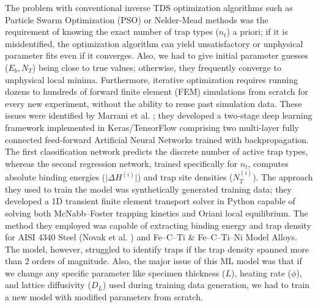 \documentclass[a4paper,12pt,oneside]{report}
\begin{document}
The problem with conventional inverse TDS optimization algorithms such as Particle Swarm Optimization (PSO) or Nelder-Mead methods was the requirement of knowing the exact number of trap types ($n_t$) a priori; if it is misidentified, the optimization algorithm can yield unsatisfactory or unphysical parameter fits even if it converges. Also, we had to give initial parameter guesses ($E_b, N_T$) being close to true values; otherwise, they frequently converge to unphysical local minima. Furthermore, iterative optimization requires running dozens to hundreds of forward finite element (FEM) simulations from scratch for every new experiment, without the ability to reuse past simulation data. These issues were identified by Marrani et al. \cite{Marrani2025}; they developed a two-stage deep learning framework implemented in Keras/TensorFlow comprising two multi-layer fully connected feed-forward Artificial Neural Networks trained with backpropagation. The first classification network predicts the discrete number of active trap types, whereas the second regression network, trained specifically for $n_t$, computes absolute binding energies ($\vert{}\Delta H^{(i)}\vert{}$) and trap site densities ($N_T^{(i)}$). The approach they used to train the model was synthetically generated training data; they developed a 1D transient finite element transport solver in Python capable of solving both McNabb–Foster trapping kinetics and Oriani local equilibrium. The method they employed was capable of extracting binding energy and trap density for AISI 4340 Steel (Novak et al. \cite{Novak2010}) and Fe–C–Ti \& Fe–C–Ti–Ni Model Alloys. The model, however, struggled to identify traps if the trap density spanned more than 2 orders of magnitude. Also, the major issue of this ML model was that if we change any specific parameter like specimen thickness ($L$), heating rate ($\phi$), and lattice diffusivity ($D_L$) used during training data generation, we had to train a new model with modified parameters from scratch.
\end{document}
